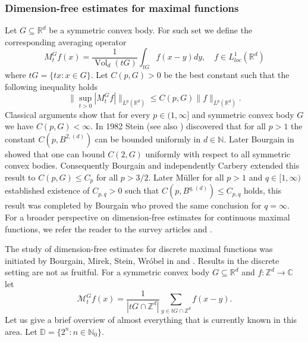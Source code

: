 \documentclass[a4paper,oneside, reqno]{amsart}
\numberwithin{equation}{section}
\theoremstyle{definition}%
\theoremstyle{definition}
\theoremstyle{definition}%
\theoremstyle{definition}
\newcommand{\Z}{\mathbb{Z}}
\newcommand{\R}{\mathbb{R}}
\newcommand{\C}{\mathbb{C}}
\newcommand{\N}{\mathbb{N}}
\DeclareMathOperator{\Vol}{Vol}
\begin{document}
\subsubsection{Dimension-free estimates for maximal functions}
Let $G \subseteq \R^d$ be a symmetric convex body. For such set we define the corresponding averaging operator
\begin{equation} \label{cont avr op defn}
   M_t^Gf(x)= \frac{1}{\Vol_d(tG)} \int_{tG} f(x-y)dy, \quad f \in L^1_{loc}(\R^d) 
\end{equation}
where $tG=\{tx: x \in G\}$. Let $C(p,G)>0$ be the best constant such that the following inequality holds 
\[
\Big\| \sup_{t>0} |M_t^Gf| \Big\|_{L^p(\R^d)} \le C(p,G) \|f \|_{L^p(\R^d)}.
\]
Classical arguments show that for every $p \in (1,\infty]$ and symmetric convex body $G$ we have $C(p,G)<\infty$. In 1982 Stein \cite{SteinMax} (see also \cite{StStr}) discovered that for all $p>1$ the constant $C(p,B^{2,(d)})$ can be bounded uniformly in $d \in \N$. Later Bourgain in \cite{B1} showed that one can bound $C(2,G)$ uniformly with respect to all symmetric convex bodies. Consequently Bourgain \cite{B2} and independently Carbery \cite{Car1} extended this result to $C(p,G) \le C_p$ for all $p>3/2$. Later Müller \cite{Mul1} for all $p>1$ and $q \in [1, \infty)$ established existence of $C_{p,q}>0$ such that $C(p,B^{q,(d)}) \le C_{p,q}$ holds, this result was completed by Bourgain \cite{B3} who proved the same conclusion for $q=\infty$.
For a broader perspective on dimension-free estimates for
continuous maximal functions, we refer the reader to the survey articles \cite{BMSW4} and \cite{HL-cont}.
\par The study of dimension-free estimates for discrete maximal functions was initiated by Bourgain, Mirek, Stein, Wróbel in \cite{cubes} and \cite{balls}.
Results in the discrete setting are not as fruitful.
For a symmetric convex body $G \subseteq \R^d$ and $f: \Z^d \to \C$ let 
\[
\mathcal{M}_t^G f(x)= \frac{1}{|tG \cap \Z^d|} \sum_{y \in tG \cap \Z^d} f(x-y).
\]
Let us give a brief overview of almost everything that is currently known in this area. Let $\mathbb{D}= \{2^n:n \in \N_0\}$.
\end{document}

